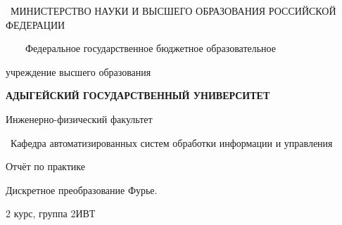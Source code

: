 \documentclass[a4paper]{article}
\date{2025-06-05}
\begin{document}
{\centering{}
\ МИНИСТЕРСТВО НАУКИ И ВЫСШЕГО ОБРАЗОВАНИЯ РОССИЙСКОЙ ФЕДЕРАЦИИ
\par}

{\centering{}
\ \ \ \ Федеральное государственное бюджетное образовательное 
\par}

{\centering{}
учреждение высшего образования
\par}

{\centering{}\bfseries
АДЫГЕЙСКИЙ ГОСУДАРСТВЕННЫЙ УНИВЕРСИТЕТ
\par}


\bigskip

{\centering{}
Инженерно-физический факультет
\par}

{\centering{}
\ Кафедра автоматизированных систем обработки информации и управления
\par}


\bigskip


\bigskip


\bigskip


\bigskip


\bigskip


\bigskip


\bigskip

{\centering{}
Отчёт по практике
\par}

{\centering{}
Дискретное преобразование Фурье.
\par}


\bigskip


\bigskip

{\centering{}
2 курс, группа 2ИВТ
\par}


\bigskip


\bigskip


\bigskip


\bigskip


\bigskip


\bigskip


\bigskip


\bigskip


\bigskip


\bigskip


\bigskip


\bigskip
\end{document}

